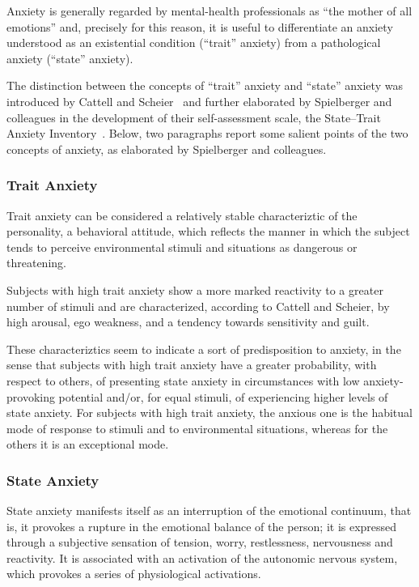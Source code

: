Anxiety is generally regarded by mental-health professionals as ``the mother of
all emotions'' and, precisely for this reason, it is useful to differentiate an
anxiety understood as an existential condition (``trait'' anxiety) from a
pathological anxiety (``state'' anxiety).

The distinction between the concepts of ``trait'' anxiety and ``state'' anxiety
was introduced by Cattell and Scheier~\cite{cattell} and further elaborated by
Spielberger and colleagues in the development of their self-assessment scale, the
State--Trait Anxiety Inventory~\cite{stai}. Below, two paragraphs report some
salient points of the two concepts of anxiety, as elaborated by Spielberger and
colleagues.

\subsubsection{Trait Anxiety}

Trait anxiety can be considered a relatively stable characteriztic of the
personality, a behavioral attitude, which reflects the manner in which the
subject tends to perceive environmental stimuli and situations as dangerous or
threatening.

Subjects with high trait anxiety show a more marked reactivity to a greater
number of stimuli and are characterized, according to Cattell and Scheier, by
high arousal, ego weakness, and a tendency towards sensitivity and guilt.

These characteriztics seem to indicate a sort of predisposition to anxiety, in
the sense that subjects with high trait anxiety have a greater probability, with
respect to others, of presenting state anxiety in circumstances with low
anxiety-provoking potential and/or, for equal stimuli, of experiencing higher
levels of state anxiety. For subjects with high trait anxiety, the anxious one is
the habitual mode of response to stimuli and to environmental situations, whereas
for the others it is an exceptional mode.

\subsubsection{State Anxiety}

State anxiety manifests itself as an interruption of the emotional continuum,
that is, it provokes a rupture in the emotional balance of the person; it is
expressed through a subjective sensation of tension, worry, restlessness,
nervousness and reactivity. It is associated with an activation of the autonomic
nervous system, which provokes a series of physiological activations.

